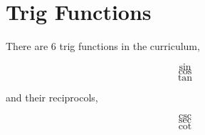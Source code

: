 \documentclass[../main.tex]{subfiles}
\begin{document}
\section{Trig Functions}

There are 6 trig functions in the curriculum,

\[ \sin \]
\[ \cos \]
\[ \tan \]

and their reciprocols,

\[ \csc \]
\[ \sec \]
\[ \cot \]
\end{document}
